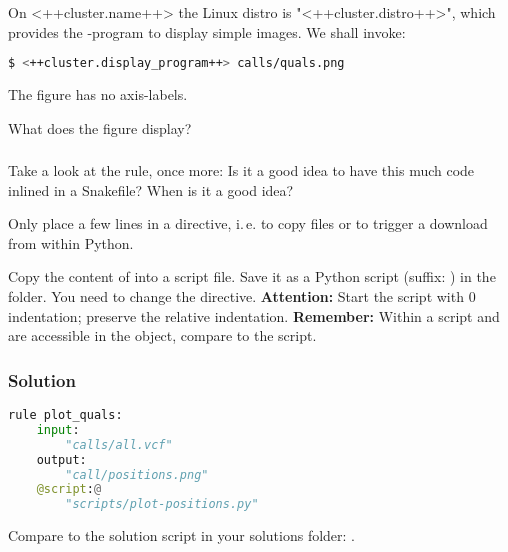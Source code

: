 \begin{frame}[fragile]
	\frametitle{}
	On <++cluster.name++> the Linux distro is "<++cluster.distro++>", which \newline provides the -program to display simple images. We shall invoke:
	\begin{lstlisting}[language=Bash, style=Shell]
$ <++cluster.display_program++> calls/quals.png
	\end{lstlisting}
	The figure has no axis-labels.
	\begin{question}
		What does the figure display?
	\end{question}
\end{frame}

\begin{frame}[fragile]
	\frametitle{}
	\footnotesize
	\begin{question}
		Take a look at the  rule, once more: Is it a good idea to have this much code inlined in a Snakefile? When is it a good idea?
	\end{question}
	\pause
	\begin{docs}
		Only place a few lines in a  directive, i.\,e. to copy files or to trigger a download from within Python.
	\end{docs}
	\pause
	\begin{task}
		Copy the content of  into a script file. Save it as a Python script (suffix: ) in the  folder. You need to change the  directive.\newline
		\textbf{Attention:} Start the script with 0 indentation; preserve the relative indentation.\newline
		\textbf{Remember:} Within a script  and  are accessible in the  object, compare to the  script.
	\end{task}
\end{frame}

\begin{frame}[fragile]
	\frametitle{Solution}
	\begin{lstlisting}[language=Python,style=Python]
rule plot_quals:
    input:
        "calls/all.vcf"
    output:
        "call/positions.png"
    @script:@
        "scripts/plot-positions.py"
	\end{lstlisting}
	Compare to the solution script in your solutions folder: .
\end{frame}

